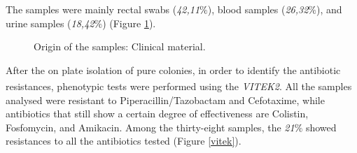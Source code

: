 \documentclass[11pt]{report}
\begin{document}
The samples were mainly rectal swabs (\emph{42,11$\%$}), blood samples (\emph{26,32$\%$}), and urine samples (\emph{18,42$\%$}) (Figure \ref{clinical_mat}).

\begin{figure}[h!]
\centering
{}
\caption{Origin of the samples: Clinical material.}
\label{clinical_mat}
\end{figure}

\clearpage

After the on plate isolation of pure colonies, in order to identify the antibiotic resistances, phenotypic tests were performed using the \emph{VITEK}\textsuperscript{\textregistered}\emph{2}.
All the samples analysed were resistant to Piperacillin/Tazobactam and Cefotaxime, while antibiotics that still show a certain degree of effectiveness are Colistin, Fosfomycin, and Amikacin.
Among the thirty-eight samples, the \emph{21$\%$} showed resistances to all the antibiotics tested (Figure \ref{vitek}).
\end{document}
